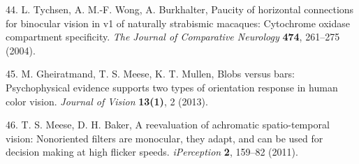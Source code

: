 \documentclass[
]{article}
\begin{document}
\leavevmode\hypertarget{ref-Tychsen2004}{}%
44. L. Tychsen, A. M.-F. Wong, A. Burkhalter, Paucity of horizontal connections for binocular vision in v1 of naturally strabismic macaques: Cytochrome oxidase compartment specificity. \emph{The Journal of Comparative Neurology} \textbf{474}, 261--275 (2004).

\leavevmode\hypertarget{ref-Gheiratmand2013}{}%
45. M. Gheiratmand, T. S. Meese, K. T. Mullen, Blobs versus bars: Psychophysical evidence supports two types of orientation response in human color vision. \emph{Journal of Vision} \textbf{13(1)}, 2 (2013).

\leavevmode\hypertarget{ref-Meese2011}{}%
46. T. S. Meese, D. H. Baker, A reevaluation of achromatic spatio-temporal vision: Nonoriented filters are monocular, they adapt, and can be used for decision making at high flicker speeds. \emph{iPerception} \textbf{2}, 159--82 (2011).
\end{document}
